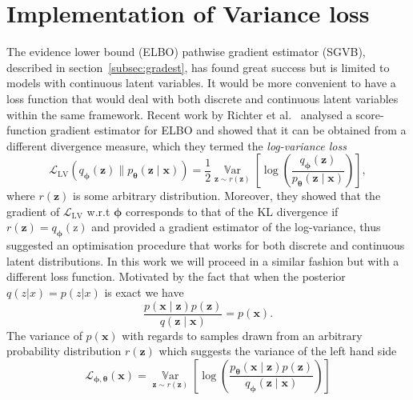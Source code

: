\documentclass[final,3p,times,twocolumn]{elsarticle}
\begin{document}
\section{Implementation of Variance loss}
The evidence lower bound (ELBO) pathwise gradient estimator (SGVB), described in section~\ref{subsec:gradest}, has found great success but is limited to models with continuous latent variables. It would be more convenient to have a loss function that would deal with both discrete and continuous latent variables within the same framework. Recent work by Richter et al.~\cite{richter2020vargrad} analysed a score-function gradient estimator for ELBO and showed that it can be obtained from a different divergence measure, which they termed the \emph{log-variance loss}
\begin{equation}
	\mathcal{L}_{\text{LV}}\left(q_{\boldsymbol{\phi}}(\mathbf{z}) \| p_{\boldsymbol{\theta}}(\mathbf{z} \mid \mathbf{x})\right)=\frac{1}{2} \underset{\mathbf{\mathbf{z}} \sim r(\mathbf{\mathbf{z}})}{\operatorname{\mathbb{V}ar}}\left[\log \left(\frac{q_{\boldsymbol{\phi}}(\mathbf{z})}{p_{\boldsymbol{\theta}}(\mathbf{z} \mid \mathbf{x})}\right)\right],
\end{equation}
where $r(\mathbf{z})$ is some arbitrary distribution. Moreover, they showed that the gradient of $\mathcal{L}_{\text{LV}}$ w.r.t $\boldsymbol{\phi}$ corresponds to that of the KL divergence if $r(\mathbf{\mathbf{z}}) = q_{\boldsymbol{\phi}}(\mathrm{z})$ and provided a gradient estimator of the log-variance, thus suggested an optimisation procedure that works for both discrete and continuous latent distributions. In this work we will proceed in a similar fashion but with a different loss function. Motivated by the fact that when the posterior $q(z | x) = p(z | x)$ is exact we have
\begin{equation}
	\frac{p(\mathbf{x} \mid \mathbf{z}) p(\mathbf{z})}{q(\mathbf{z} \mid \mathbf{x})}=p(\mathbf{x}).
\end{equation}
The variance of $p(\mathbf{x})$ with regards to samples drawn from an arbitrary probability distribution $r(\mathbf{z})$ which suggests the variance of the left hand side
\begin{equation}
	\mathcal{L}_{\boldsymbol{\phi}, \boldsymbol{\theta}}(\mathbf{x}) = \underset{\mathbf{z} \sim r(\mathbf{z})}{\operatorname{\mathbb{V}ar}}\left[\log \left(\frac{p_{\boldsymbol{\theta}}(\mathbf{x} \mid \mathbf{z}) p(\mathbf{z})}{q_{\boldsymbol{\phi}}(\mathbf{z} \mid \mathbf{x})}\right)\right]
\end{equation}
\end{document}
